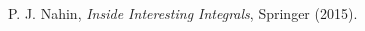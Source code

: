 \begin{thebibliography}{99}


 P. J.  Nahin,  \textit{Inside Interesting Integrals}, Springer (2015).

\end{thebibliography}